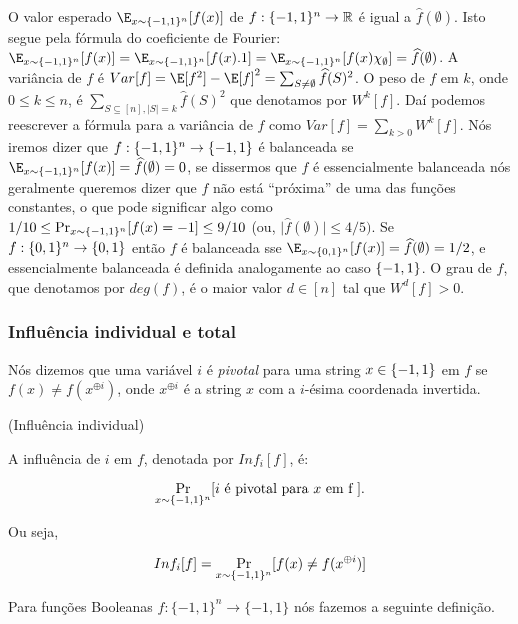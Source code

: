 O valor esperado $\uniE[f(x)]$ de $f: \{-1, 1\}^{n} \to \mathbb{R}$ é igual a $\widehat{f}(\emptyset)$. Isto segue pela fórmula do coeficiente de Fourier: $\uniE[f(x)] = \uniE[f(x).1] = \uniE[f(x)\chi_{\emptyset}] = \widehat{f}(\emptyset)$. A variância de $f$ é $Var[f] = \E[f^{2}] - \E[f]^{2} = \sum_{S \neq \emptyset} \widehat{f}(S)^{2}$. O peso de $f$ em $k$, onde $0 \leq k \leq n$, é $\sum_{S \subseteq [n], \vert S \vert = k} \widehat{f}(S)^{2}$ que denotamos por $W^{k}[f]$. Daí podemos reescrever a fórmula para a variância de $f$ como $Var[f] = \sum_{k > 0}W^{k}[f]$. Nós iremos dizer que $f: \{-1, 1\}^{n} \to \{-1, 1\}$ é balanceada se $\E_{x \sim \pmonen}[f(x)] = \widehat{f}(\emptyset) = 0$, se dissermos que $f$ é essencialmente balanceada nós geralmente queremos dizer que $f$ não está ``próxima'' de uma das funções constantes, o que pode significar algo como $1/10 \leq \Pr_{x \sim \{-1, 1\}^{n}}[f(x) = -1] \leq 9/10$ (ou, $\lvert \widehat{f}(\emptyset) \rvert \leq 4/5)$. Se $f: \{0, 1\}^{n} \to \{0, 1\}$ então $f$ é balanceada sse $\E_{x \sim \binalphn}[f(x)] = \widehat{f}(\emptyset) = 1/2$, e essencialmente balanceada é definida analogamente ao caso $\{-1, 1\}$.  O grau de $f$, que denotamos por $deg(f)$, é o maior valor $d \in [n]$ tal que $W^{d}[f] > 0$.

\subsubsection{Influência individual e total}

Nós dizemos que uma variável $i$ é \emph{pivotal} para uma string $x \in \{-1, 1\}$ em $f$ se $f(x) \neq f(x^{\oplus i})$, onde $x^{\oplus i}$ é a string $x$ com a $i$-ésima coordenada invertida. 

\begin{defi}(Influência individual) \label{defi: inf}

A influência de $i$ em $f$, denotada por $Inf_{i}[f]$, é:

\begin{equation*}
    \Pr_{x \sim \{-1, 1\}^{n}}[i \text{ é pivotal para } x \text{ em f }].
\end{equation*}

Ou seja,

\begin{equation*}
    Inf_{i}[f] = \Pr_{x \sim \{-1, 1\}^{n}}[f(x) \neq f(x^{\oplus i})]
\end{equation*}

\end{defi}

Para funções Booleanas $f: \{-1, 1\}^{n} \to \{-1, 1\}$ nós fazemos a seguinte definição.

